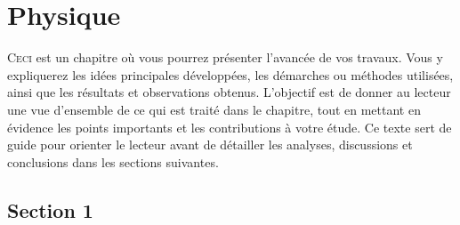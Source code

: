 

\graphicspath{{5_Images/4_Physique/}}                           %
\makeatletter
{}                         %
\makeatother


\chapter{Physique}\label{chap:Physique}                         %

\begin{chapabstract}                                            %
    \lettrine[slope=0.5em,nindent=0.5em]{C}{eci}
    est un chapitre où vous pourrez présenter l’avancée de vos travaux. Vous y expliquerez les idées principales développées, les démarches ou méthodes utilisées, ainsi que les résultats et observations obtenus. L’objectif est de donner au lecteur une vue d’ensemble de ce qui est traité dans le chapitre, tout en mettant en évidence les points importants et les contributions à votre étude. Ce texte sert de guide pour orienter le lecteur avant de détailler les analyses, discussions et conclusions dans les sections suivantes.
\end{chapabstract}

\minitoc%
\newpage                                                        %


\section{Section 1}\label{sec:1_1}

